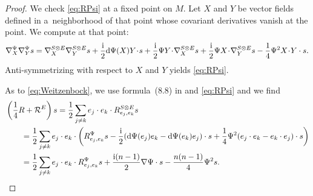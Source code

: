 \documentclass[11pt]{article}
\numberwithin{equation}{section}
\numberwithin{equation}{section}
\begin{document}
\begin{proof}
We check \eqref{eq:RPsi} at a fixed point on $M$. Let $X$ and $Y$ be vector fields defined in a~neighborhood of that point whose covariant derivatives vanish at the point. We compute at that point:
\begin{align*}
\nabla^\Psi_X \nabla^\Psi_Y s
=
\nabla^{S \otimes E}_X \nabla^{S \otimes E}_Y s + \frac{\rm i}{2} {\rm d}\Psi(X)Y\!\cdot\! s + \frac{\rm i}{2} \Psi Y \!\cdot\! \nabla^{S \otimes E}_X s + \frac{\rm i}{2} \Psi X \!\cdot\! \nabla^{S \otimes E}_Y s
 - \frac{1}{4} \Psi^2 X \!\cdot\! Y\cdot s.
\end{align*}
Anti-symmetrizing with respect to $X$ and $Y$ yields \eqref{eq:RPsi}.

As to \eqref{eq:Weitzenbock}, we use formula~(8.8) in \cite[Chapter~II]{Lawson-Michelsohn} and \eqref{eq:RPsi} and we find
\begin{align*}
&\left(\frac{1}{4} R + \mathcal{R}^E\right)s =
\frac{1}{2} \sum_{j \neq k} e_j\cdot e_k\cdot R^{S \otimes E}_{e_j,e_k} s \\
&\qquad=
\frac{1}{2} \sum_{j \neq k} e_j\cdot e_k\cdot \left( R^\Psi_{e_j,e_k} s - \frac{\rm i}{2} ({\rm d}\Psi(e_j)e_k-{\rm d}\Psi(e_k)e_j) \cdot s + \frac{1}{4} \Psi^2 (e_j\cdot e_k-e_k\cdot e_j) \cdot s \right) \\
&\qquad=
\frac{1}{2} \sum_{j \neq k} e_j\cdot e_k\cdot R^\Psi_{e_j,e_k} s + \frac{{\rm i}(n-1)}{2} \nabla\Psi \cdot s - \frac{n(n-1)}{4} \Psi^2 s.\tag*{\qed}
\end{align*} \renewcommand{\qed}{}
\end{proof}
\end{document}
